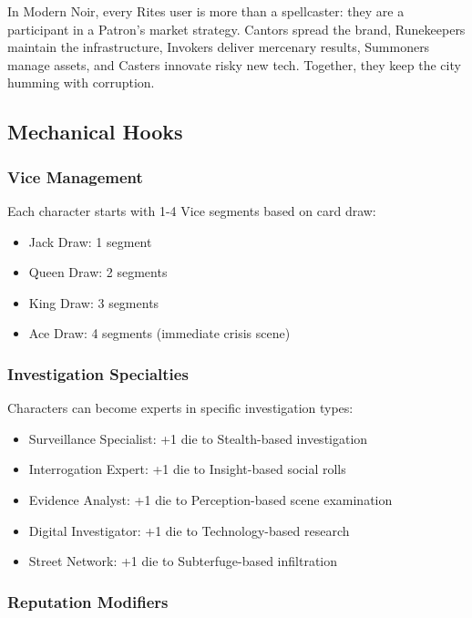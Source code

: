 \documentclass[11pt]{article}
\begin{document}
\begin{tcolorbox}[colback=black!2,colframe=black!40!white,title={Noir Table Stakes}]
In Modern Noir, every Rites user is more than a spellcaster: they are a participant in a Patron’s market strategy.
Cantors spread the brand, Runekeepers maintain the infrastructure, Invokers deliver mercenary results, Summoners manage assets, and Casters innovate risky new tech. Together, they keep the city humming with corruption.
\end{tcolorbox}

\subsection{Mechanical Hooks}

\subsubsection{Vice Management}

Each character starts with 1-4 Vice segments based on card draw:
\begin{itemize}
\item Jack Draw: 1 segment
\item Queen Draw: 2 segments
\item King Draw: 3 segments  
\item Ace Draw: 4 segments (immediate crisis scene)
\end{itemize}

\subsubsection{Investigation Specialties}

Characters can become experts in specific investigation types:
\begin{itemize}
\item Surveillance Specialist: +1 die to Stealth-based investigation
\item Interrogation Expert: +1 die to Insight-based social rolls
\item Evidence Analyst: +1 die to Perception-based scene examination
\item Digital Investigator: +1 die to Technology-based research
\item Street Network: +1 die to Subterfuge-based infiltration
\end{itemize}

\subsubsection{Reputation Modifiers}
\end{document}
